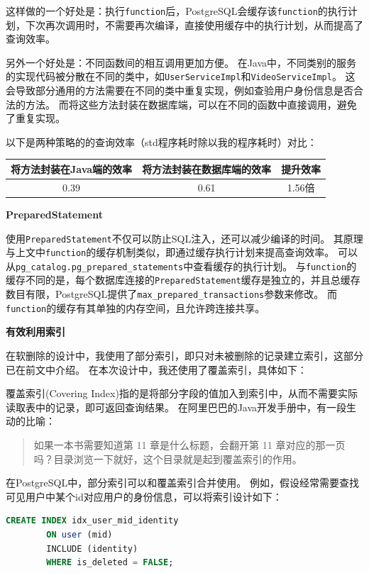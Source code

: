 \documentclass[a4paper,10pt]{ctexart}
\begin{document}
这样做的一个好处是：执行\texttt{function}后，PostgreSQL会缓存该\texttt{function}的执行计划，下次再次调用时，不需要再次编译，直接使用缓存中的执行计划，从而提高了查询效率。

另外一个好处是：不同函数间的相互调用更加方便。
在Java中，不同类别的服务的实现代码被分散在不同的类中，如\texttt{UserServiceImpl}和\texttt{VideoServiceImpl}。
这会导致部分通用的方法需要在不同的类中重复实现，例如查验用户身份信息是否合法的方法。
而将这些方法封装在数据库端，可以在不同的函数中直接调用，避免了重复实现。

以下是两种策略的的查询效率（std程序耗时除以我的程序耗时）对比：
\begin{center}
    \begin{tabular}{ccc}
        \toprule
        \textbf{将方法封装在Java端的效率} & \textbf{将方法封装在数据库端的效率} & \textbf{提升效率} \\
        \midrule
        0.39 & 0.61 & 1.56倍 \\
        \bottomrule
    \end{tabular}
\end{center}

\textbf{PreparedStatement}

使用\texttt{PreparedStatement}不仅可以防止SQL注入，还可以减少编译的时间。
其原理与上文中\texttt{function}的缓存机制类似，即通过缓存执行计划来提高查询效率。
可以从\texttt{pg\_catalog.pg\_prepared\_statements}中查看缓存的执行计划。
与\texttt{function}的缓存不同的是，每个数据库连接的\texttt{PreparedStatement}缓存是独立的，并且总缓存数目有限，PostgreSQL提供了\texttt{max\_prepared\_transactions}参数来修改。
而\texttt{function}的缓存有其单独的内存空间，且允许跨连接共享。

\textbf{有效利用索引}

在软删除的设计中，我使用了部分索引，即只对未被删除的记录建立索引，这部分已在前文中介绍。
在本次设计中，我还使用了覆盖索引，具体如下：

覆盖索引(Covering Index)指的是将部分字段的值加入到索引中，从而不需要实际读取表中的记录，即可返回查询结果。
在阿里巴巴的Java开发手册中，有一段生动的比喻：
\begin{quote}
    如果一本书需要知道第 11 章是什么标题，会翻开第 11 章对应的那一页吗？目录浏览一下就好，这个目录就是起到覆盖索引的作用。
\end{quote}

在PostgreSQL中，部分索引可以和覆盖索引合并使用。
例如，假设经常需要查找可见用户中某个id对应用户的身份信息，可以将索引设计如下：
\begin{center}
    \begin{lstlisting}[language=SQL]
        CREATE INDEX idx_user_mid_identity
        ON user (mid)
        INCLUDE (identity)
        WHERE is_deleted = FALSE;
    \end{lstlisting}
\end{center}
\end{document}
